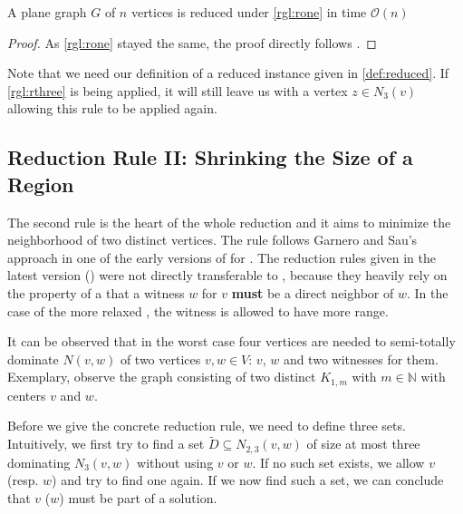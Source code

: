 \begin{lemma}
    A plane graph $G$ of $n$ vertices is reduced under \cref{rgl:rone} in time $\mathcal{O}(n)$
\end{lemma}
\begin{proof}
    As \cref{rgl:rone} stayed the same, the proof directly follows \cite[Lemma 2]{Alber2004}.
\end{proof}

Note that we need our definition of a reduced instance given in \ref{def:reduced}. If \cref{rgl:rthree} is being applied, it will still leave us with a vertex $z\in N_3(v)$ allowing this rule to be applied again.

\subsection{Reduction Rule II: Shrinking the Size of a Region}

The second rule is the heart of the whole reduction and it aims to minimize the neighborhood of two distinct vertices. The rule follows Garnero and Sau's approach in one of the early versions of \cite[Revision 2014]{Garnero2018} for \ptdom. The reduction rules given in the latest version (\cite[Revision 2018]{Garnero2018}) were not directly transferable to \psdom, because they heavily rely on the property of a \tdom that a witness $w$ for $v$ \textbf{must} be a direct neighbor of $w$. In the case of the more relaxed \sdom, the witness is allowed to have more range.


It can be observed that in the worst case four vertices are needed to semi-totally dominate $N(v,w)$ of two vertices $v,w \in V$: $v$, $w$ and two witnesses for them. Exemplary, observe the graph consisting of two distinct $K_{1,m}$ with $m \in \mathbb{N}$ with centers $v$ and $w$.

Before we give the concrete reduction rule, we need to define three sets. Intuitively, we first try to find a set $\tilde D \subseteq N_{2,3}(v,w)$ of size at most three dominating $N_3(v,w)$ without using $v$ or $w$. If no such set exists, we allow $v$ (resp. $w$) and try to find one again. If we now find such a set, we can conclude that $v$ ($w$) must be part of a solution.

